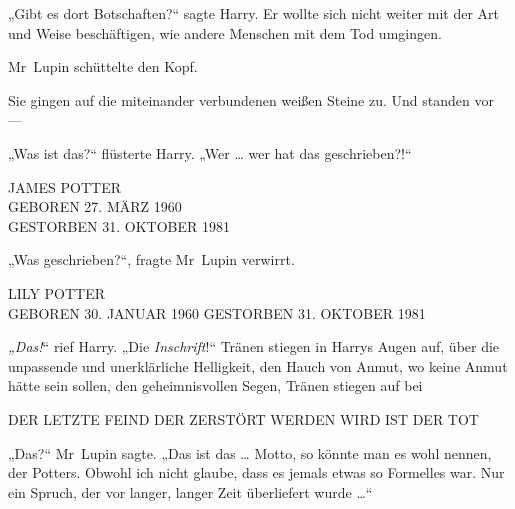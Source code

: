 „Gibt es dort Botschaften?“ sagte Harry. Er wollte sich nicht weiter mit der Art und Weise beschäftigen, wie andere Menschen mit dem Tod umgingen.

Mr~Lupin schüttelte den Kopf.


Sie gingen auf die miteinander verbundenen weißen Steine zu. Und standen vor —

„Was ist das?“ flüsterte Harry.
„Wer … wer hat das geschrieben?!“

\begin{center}
JAMES POTTER\\
GEBOREN 27. MÄRZ 1960\\
GESTORBEN 31. OKTOBER 1981
\end{center}

„Was geschrieben?“, fragte Mr~Lupin verwirrt.

\begin{center}
LILY POTTER\\
GEBOREN 30. JANUAR 1960
GESTORBEN 31. OKTOBER 1981
\end{center}

\emph{„Das!}“ rief Harry.
„Die \emph{Inschrift}!“
Tränen stiegen in Harrys Augen auf, über die unpassende und unerklärliche Helligkeit, den Hauch von Anmut, wo keine Anmut hätte sein sollen, den geheimnisvollen Segen, Tränen stiegen auf bei

\begin{center}
DER LETZTE FEIND DER ZERSTÖRT WERDEN WIRD IST DER TOT
\end{center}

„Das?“ Mr~Lupin sagte.
„Das ist das … Motto, so könnte man es wohl nennen, der Potters. Obwohl ich nicht glaube, dass es jemals etwas so Formelles war. Nur ein Spruch, der vor langer, langer Zeit überliefert wurde …“

